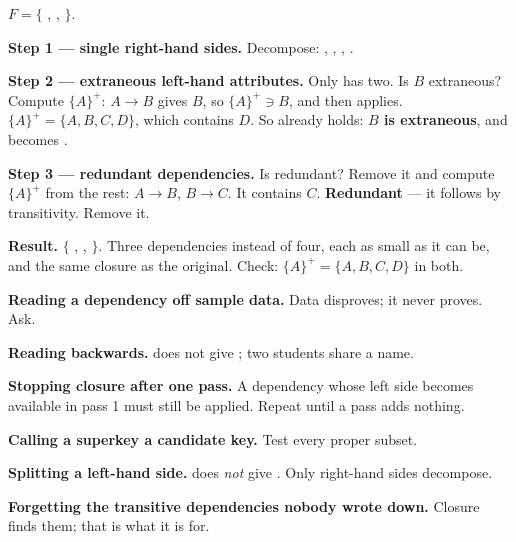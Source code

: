 \begin{worked}
$F = \{$ , ,  $\}$.

\medskip
\textbf{Step 1 --- single right-hand sides.} Decompose:
, , , .

\medskip
\textbf{Step 2 --- extraneous left-hand attributes.} Only  has two.
Is $B$ extraneous? Compute $\{A\}^{+}$: $A \rightarrow B$ gives $B$, so
$\{A\}^{+} \ni B$, and then  applies. $\{A\}^{+} = \{A,B,C,D\}$,
which contains $D$. So  already holds: \textbf{$B$ is extraneous},
and  becomes .

\medskip
\textbf{Step 3 --- redundant dependencies.} Is  redundant? Remove it
and compute $\{A\}^{+}$ from the rest: $A \to B$, $B \to C$. It contains $C$.
\textbf{Redundant} --- it follows by transitivity. Remove it.

\medskip
\textbf{Result.} $\{$ , ,  $\}$. Three dependencies
instead of four, each as small as it can be, and the same closure as the
original. Check: $\{A\}^{+} = \{A,B,C,D\}$ in both.
\end{worked}

\begin{pitfall}
\begin{tight}
  \item \textbf{Reading a dependency off sample data.} Data disproves; it never
        proves. Ask.
  \item \textbf{Reading  backwards.}  does not
        give ; two students share a name.
  \item \textbf{Stopping closure after one pass.} A dependency whose left side
        becomes available in pass 1 must still be applied. Repeat until a pass
        adds nothing.
  \item \textbf{Calling a superkey a candidate key.} Test every proper subset.
  \item \textbf{Splitting a left-hand side.}  does \emph{not} give
        . Only right-hand sides decompose.
  \item \textbf{Forgetting the transitive dependencies nobody wrote down.}
        Closure finds them; that is what it is for.
\end{tight}
\end{pitfall}


